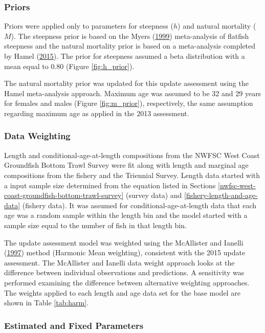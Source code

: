 \documentclass[12pt,]{article}
\begin{document}
\subsubsection{Priors}\label{priors}

Priors were applied only to parameters for steepness (\(h\)) and natural
mortality (\(M\)). The steepness prior is based on the Myers
(\protect\hyperlink{ref-myers_maximum_1999}{1999}) meta-analysis of
flatfish steepness and the natural mortality prior is based on a
meta-analysis completed by Hamel
(\protect\hyperlink{ref-hamel_method_2015}{2015}). The prior for
steepness assumed a beta distribution with a mean equal to 0.80 (Figure
\ref{fig:h_prior}).

The natural mortality prior was updated for this update assessment using
the Hamel meta-analysis approach. Maximum age was assumed to be 32 and
29 years for females and males (Figure \ref{fig:m_prior}), respectively,
the same assumption regarding maximum age as applied in the 2013
assessment.

\subsubsection{Data Weighting}\label{data-weighting}

Length and conditional-age-at-length compositions from the NWFSC West
Coast Groundfish Bottom Trawl Survey were fit along with length and
marginal age compositions from the fishery and the Triennial Survey.
Length data started with a input sample size determined from the
equation listed in Sections
\ref{nwfsc-west-coast-groundfish-bottom-trawl-survey} (survey data) and
\ref{fishery-length-and-age-data} (fishery data). It was assumed for
conditional-age-at-length data that each age was a random sample within
the length bin and the model started with a sample size equal to the
number of fish in that length bin.

The update assessment model was weighted using the McAllister and
Ianelli (\protect\hyperlink{ref-mcallister_bayesian_1997}{1997}) method
(Harmonic Mean weighting), consistent with the 2015 update assessment.
The McAllister and Ianelli data weight approach looks at the difference
between individual observations and predictions. A sensitivity was
performed examining the difference between alternative weighting
approaches. The weights applied to each length and age data set for the
base model are shown in Table \ref{tab:harm}.

\subsubsection{Estimated and Fixed
Parameters}\label{estimated-and-fixed-parameters}
\end{document}
